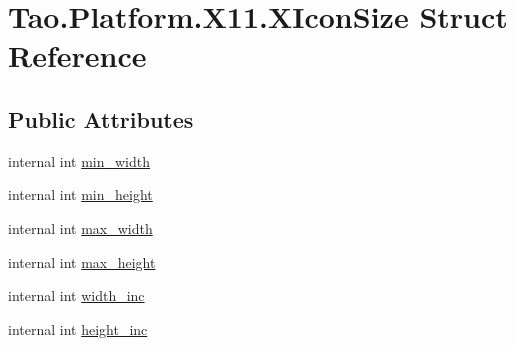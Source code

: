 \hypertarget{struct_tao_1_1_platform_1_1_x11_1_1_x_icon_size}{
\section{Tao.Platform.X11.XIconSize Struct Reference}
\label{struct_tao_1_1_platform_1_1_x11_1_1_x_icon_size}
}
\subsection*{Public Attributes}
\begin{DoxyCompactItemize}
\item 
internal int \hyperlink{struct_tao_1_1_platform_1_1_x11_1_1_x_icon_size_a50237946e170bd56ee17f76e8195b7af}{min\_\-width}
\item 
internal int \hyperlink{struct_tao_1_1_platform_1_1_x11_1_1_x_icon_size_ac8af972b24b83166af2348451231dea2}{min\_\-height}
\item 
internal int \hyperlink{struct_tao_1_1_platform_1_1_x11_1_1_x_icon_size_a2304cee4e68a4cd512c337d367e3783a}{max\_\-width}
\item 
internal int \hyperlink{struct_tao_1_1_platform_1_1_x11_1_1_x_icon_size_a23ed44242cd7a0f1150e287ac10b5532}{max\_\-height}
\item 
internal int \hyperlink{struct_tao_1_1_platform_1_1_x11_1_1_x_icon_size_ab84011ef40c440aaf6957f943ab6859c}{width\_\-inc}
\item 
internal int \hyperlink{struct_tao_1_1_platform_1_1_x11_1_1_x_icon_size_af6675c7d0320dfab500330cf35fda737}{height\_\-inc}
\end{DoxyCompactItemize}


